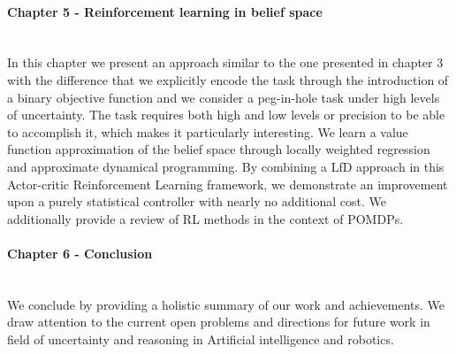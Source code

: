 \begin{minipage}[c]{0.9\textwidth}
\paragraph{Chapter 5 - Reinforcement learning in belief space}\\
In this chapter we present an approach similar to the one presented in chapter 3 with the difference that
we explicitly encode the task through the introduction of a binary objective function and we consider a peg-in-hole
task under high levels of uncertainty. The task requires both high and low levels or precision to be able to accomplish it,
which makes it particularly interesting. We learn a value function approximation of the belief space through locally weighted 
regression and approximate dynamical programming.
By combining a LfD approach in this Actor-critic Reinforcement Learning framework, we demonstrate an improvement upon 
a purely statistical controller with nearly no additional cost. 
We additionally provide a review of RL methods in the context of POMDPs.
\end{minipage}

\begin{minipage}[c]{0.9\textwidth}
\paragraph{Chapter 6 - Conclusion}\\
We conclude by providing a holistic summary of our work and achievements. We draw attention to the current 
open problems and directions for future work in field of uncertainty and reasoning in Artificial intelligence and robotics.
\end{minipage}







